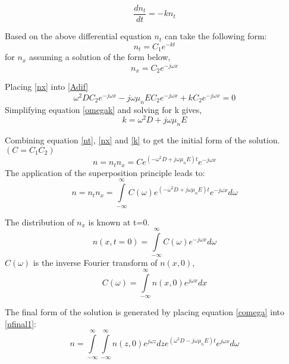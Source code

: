 \begin{doublespace}
\begin{equation}
\nonumber
\frac{d n_{t}}{d t}=-kn_t
\end{equation}

Based on the above differential equation $n_t$ can take the following form:
\begin{equation}
n_t=C_1 e^{-kt}
\label{nt}
\end{equation}
 for $n_x$ assuming a solution of the form below,
\begin{equation}
n_x=C_2 e^{-j\omega x}
\label{nx}
\end{equation}

Placing \eqref{nx} into \eqref{Adif} 
\begin{equation}
\omega^2 D C_2 e^{-j\omega x}-j\omega \mu_n E C_2 e^{-j\omega x}+kC_2e^{-j\omega x}=0
\label{omegak}
\end{equation}
Simplifying equation \eqref{omegak} and solving for k gives,
\begin{equation}
k=\omega^2 D+j\omega \mu_n E
\label{k}
\end{equation}

Combining equation \eqref{nt}, \eqref{nx} and \eqref{k} to get the initial form of the solution. $(C=C_1C_2)$
\begin{equation}
n=n_tn_x=Ce^{(-\omega^2 D + j\omega \mu_n E)t} e^{-j\omega x}
\end{equation}
The application of the superposition principle\cite{DifEq} leads to:
\begin{equation}
n=n_tn_x=\int\limits_{-\infty}^{\infty}C(\omega)e^{(-\omega^2 D + j\omega \mu_n E)t} e^{-j\omega x}d\omega
\label{nfinal1}
\end{equation}

The distribution of $n_x$ is known at t=0.
\begin{equation}
n(x,t=0)=\int\limits_{-\infty}^{\infty}C(\omega) e^{-j\omega x}d\omega
\end{equation}
$C(\omega)$ is  the inverse Fourier transform of $n(x,0)$,
\begin{equation}
C(\omega)=\int\limits_{-\infty}^{\infty}n(x,0)e^{j\omega x}dx
\label{comega}
\end{equation}

The final form of the solution is generated by placing equation \eqref{comega} into \eqref{nfinal1}:
\begin{equation}
n=\int\limits_{-\infty}^{\infty}\int\limits_{-\infty}^{\infty}n(z,0)e^{j\omega z}dz e^{(\omega ^2 D-j\omega \mu_n E)t}e^{j\omega x}d\omega
\label{nfinal2}
\end{equation}


\end{doublespace}
